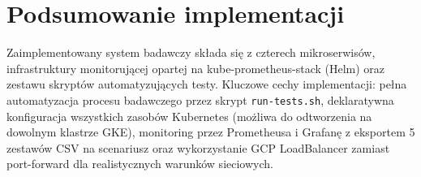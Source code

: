 



\section{Podsumowanie implementacji}

Zaimplementowany system badawczy składa się z czterech mikroserwisów, infrastruktury monitorującej opartej na kube-prometheus-stack (Helm) oraz zestawu skryptów automatyzujących testy. Kluczowe cechy implementacji: pełna automatyzacja procesu badawczego przez skrypt \texttt{run-tests.sh}, deklaratywna konfiguracja wszystkich zasobów Kubernetes (możliwa do odtworzenia na dowolnym klastrze GKE), monitoring przez Prometheusa i Grafanę z eksportem 5 zestawów CSV na scenariusz oraz wykorzystanie GCP LoadBalancer zamiast port-forward dla realistycznych warunków sieciowych.
